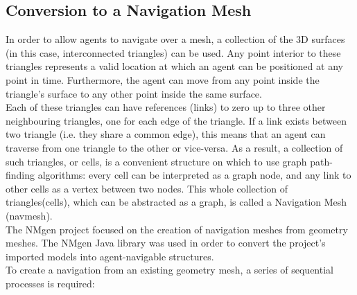 \documentclass[a4paper,11pt]{article}
\begin{document}
\subsection{Conversion to a Navigation Mesh}
In order to allow agents to navigate over a mesh, a collection of the 3D surfaces (in this case, interconnected triangles) can be used. Any point interior to these triangles represents a valid location at which an agent can be positioned at any point in time. Furthermore, the agent can move from any point inside the triangle's surface to any other point inside the same surface.\\
Each of these triangles can have references (links) to zero up to three other neighbouring triangles, one for each edge of the triangle. If a link exists between two triangle (i.e. they share a common edge), this means that an agent can traverse from one triangle to the other or vice-versa. As a result, a collection of such triangles, or cells, is a convenient structure on which to use graph path-finding algorithms: every cell can be interpreted as a graph node, and any link to other cells as a vertex between two nodes. This whole collection of triangles(cells), which can be abstracted as a graph, is called a Navigation Mesh (navmesh).\\
The NMgen project focused on the creation of navigation meshes from geometry meshes. The NMgen Java library was used in order to convert the project's imported models into agent-navigable structures.\\
To create a navigation from an existing geometry mesh, a series of sequential processes is required:
\end{document}
